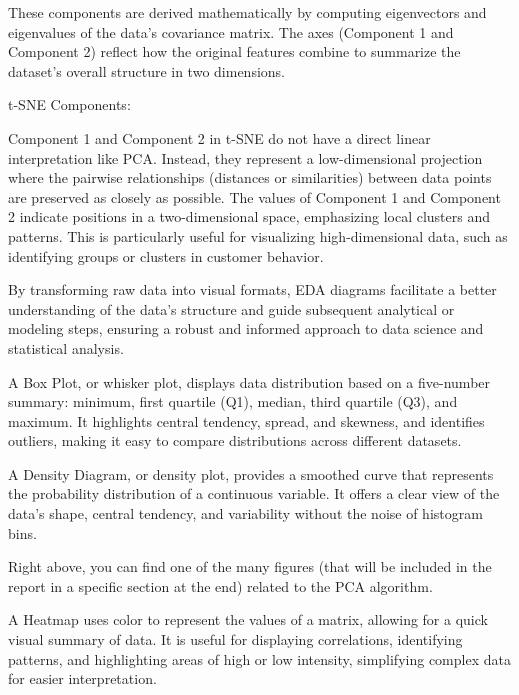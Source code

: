 \documentclass[unnumsec,webpdf,contemporary,large]{oup-authoring-template}%
\theoremstyle{thmstyleone}%
\theoremstyle{thmstyletwo}%
\theoremstyle{thmstylethree}%
\begin{document}
These components are derived mathematically by computing eigenvectors and eigenvalues of the data's covariance matrix. The axes (Component 1 and Component 2) reflect how the original features combine to summarize the dataset's overall structure in two dimensions.

\vspace{0.2cm}

t-SNE Components:

Component 1 and Component 2 in t-SNE do not have a direct linear interpretation like PCA. Instead, they represent a low-dimensional projection where the pairwise relationships (distances or similarities) between data points are preserved as closely as possible.
The values of Component 1 and Component 2 indicate positions in a two-dimensional space, emphasizing local clusters and patterns. This is particularly useful for visualizing high-dimensional data, such as identifying groups or clusters in customer behavior.

By transforming raw data into visual formats, EDA diagrams facilitate a better understanding of the data's structure and guide subsequent analytical or modeling steps, ensuring a robust and informed approach to data science and statistical analysis.
\vspace{0.2cm}

A Box Plot, or whisker plot, displays data distribution based on a five-number summary: minimum, first quartile (Q1), median, third quartile (Q3), and maximum. It highlights central tendency, spread, and skewness, and identifies outliers, making it easy to compare distributions across different datasets.
\vspace{0.2cm}

A Density Diagram, or density plot, provides a smoothed curve that represents the probability distribution of a continuous variable. It offers a clear view of the data’s shape, central tendency, and variability without the noise of histogram bins.
\vspace{0.1cm}

Right above, you can find one of the many figures (that will be included in the report in a specific section at the end) related to the PCA algorithm.
\vspace{0.2cm}

A Heatmap uses color to represent the values of a matrix, allowing for a quick visual summary of data. It is useful for displaying correlations, identifying patterns, and highlighting areas of high or low intensity, simplifying complex data for easier interpretation.
\vspace{0.2cm}
\end{document}
